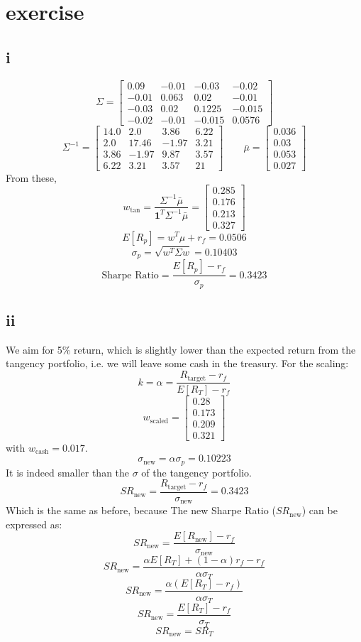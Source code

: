 \documentclass{article}
\begin{document}
\section{exercise}
\subsection*{i}
$$ \Sigma = \left[\begin{matrix}0.09 & -0.01 & -0.03 & -0.02\\-0.01 & 0.063 & 0.02 & -0.01\\-0.03 & 0.02 & 0.1225 & -0.015\\-0.02 & -0.01 & -0.015 & 0.0576\end{matrix}\right]$$
$$\Sigma^{-1} = \displaystyle \left[\begin{matrix}14.0 & 2.0 & 3.86 & 6.22\\2.0 & 17.46 & -1.97 & 3.21\\3.86 & -1.97 & 9.87 & 3.57\\6.22 & 3.21 & 3.57 & 21\end{matrix}\right]\qquad\bar\mu =  \left[\begin{matrix}0.036\\0.03\\0.053\\0.027\end{matrix}\right]$$
From these,
$$\displaystyle w_\text{tan} = \frac{\Sigma^{-1} \bar{\mu}}{\mathbf{1}^T \Sigma^{-1} \bar{\mu}} = \left[\begin{matrix}0.285\\0.176\\0.213\\0.327\end{matrix}\right]$$
$$E[R_p] = w^T \mu + r_f =  0.0506$$
\[
    \sigma_p = \sqrt{w^T \Sigma w}  = 0.10403
\]
\[
    \text{Sharpe Ratio} = \frac{E[R_p] - r_f}{\sigma_p} = 0.3423
\]
\subsection*{ii}
We aim for 5\% return, which is slightly lower than the expected return from the tangency portfolio,
i.e. we will leave some cash in the treasury. For the scaling:
\[
    k = \alpha = \frac{R_{\text{target}} - r_f}{E[R_T] - r_f}
\]
$$\displaystyle w_\text{scaled} = \left[\begin{matrix}0.28\\0.173\\0.209\\0.321\end{matrix}\right]$$
with $w_\text{cash} =  0.017$.
\[
    \sigma_{\text{new}} = \alpha \sigma_p = 0.10223
\]
It is indeed smaller than the $\sigma$ of the tangency portfolio.
\[
    SR_{\text{new}} = \frac{R_{\text{target}} - r_f}{\sigma_{\text{new}}} = 0.3423
\]
Which is the same as before, because
The new Sharpe Ratio ($SR_{\text{new}}$) can be expressed as:
\[
    SR_{\text{new}} = \frac{E[R_{\text{new}}] - r_f}{\sigma_{\text{new}}}
\]
\[
    SR_{\text{new}} = \frac{\alpha E[R_T] + (1-\alpha) r_f - r_f}{\alpha \sigma_T}
\]
\[
    SR_{\text{new}} = \frac{\alpha (E[R_T] - r_f)}{\alpha \sigma_T}
\]
\[
    SR_{\text{new}} = \frac{E[R_T] - r_f}{\sigma_T}
\]
\[
    SR_{\text{new}} = SR_T
\]
\end{document}
